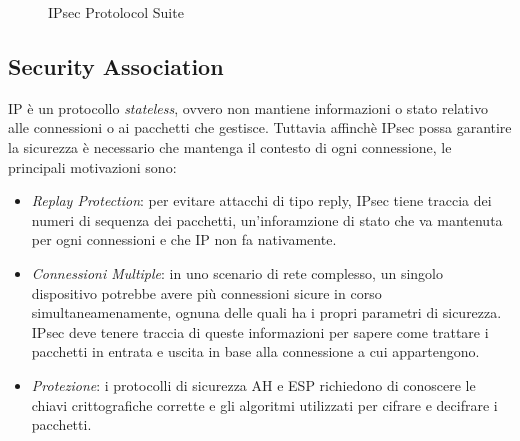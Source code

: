 \begin{figure}[!ht] 
    \centering 
    \caption{IPsec Protolocol Suite}
    \label{fig:ipsec-suite} 
\end{figure}
    

\subsection{Security Association}

IP è un protocollo \textit{stateless}, ovvero non mantiene informazioni o stato relativo alle connessioni o ai pacchetti che gestisce.
Tuttavia affinchè IPsec possa garantire la sicurezza è necessario che mantenga il contesto di ogni connessione, le principali motivazioni sono:
\begin{itemize}
    \item \textit{Replay Protection}: per evitare attacchi di tipo reply, IPsec tiene  traccia
    dei numeri di sequenza dei pacchetti, un'inforamzione di stato che va mantenuta per ogni connessioni
    e che IP non fa nativamente.
    \item \textit{Connessioni Multiple}: in uno scenario di rete complesso, un singolo dispositivo potrebbe avere più connessioni sicure in corso simultaneamenamente, ognuna
    delle quali ha i propri parametri di sicurezza. IPsec deve tenere traccia di queste informazioni per sapere come trattare i pacchetti in entrata e uscita in base alla connessione a cui appartengono.
    \item \textit{Protezione}: i protocolli di sicurezza AH e ESP richiedono di conoscere le chiavi crittografiche corrette e gli algoritmi utilizzati per cifrare e decifrare i pacchetti.
\end{itemize}


